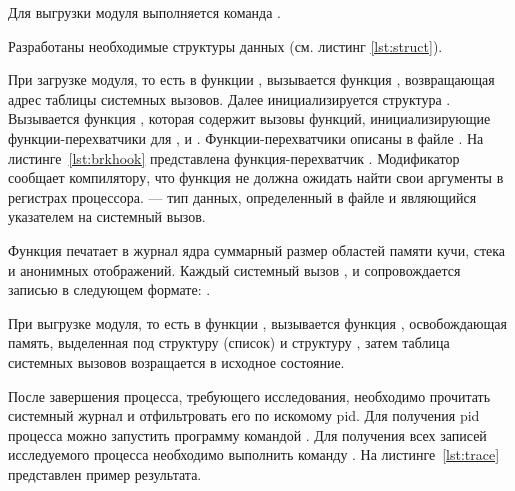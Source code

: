 Для выгрузки модуля выполняется команда .

Разработаны необходимые структуры данных (см. листинг \ref{lst:struct}).



При загрузке модуля, то есть в функции , вызывается функция , возвращающая адрес таблицы системных вызовов. Далее инициализируется структура . Вызывается функция , которая содержит вызовы функций, инициализирующие функции-перехватчики для ,  и . Функции-перехватчики описаны в файле . На листинге~\ref{lst:brkhook} представлена функция-перехватчик . Модификатор  сообщает компилятору, что функция не должна ожидать найти свои аргументы в регистрах процессора.  --- тип данных, определенный в файле  и являющийся указателем на системный вызов.



Функция  печатает в журнал ядра суммарный размер областей памяти кучи, стека и анонимных отображений. Каждый системный вызов ,  и  сопровождается записью в следующем формате: .

При выгрузке модуля, то есть в функции , вызывается функция , освобождающая память, выделенная под структуру (список)  и структуру , затем таблица системных вызовов возращается в исходное состояние.

После завершения процесса, требующего исследования, необходимо прочитать системный журнал и отфильтровать его по искомому pid. Для получения pid процесса можно запустить программу командой . Для получения всех записей  исследуемого процесса необходимо выполнить команду . На листинге~\ref{lst:trace} представлен пример результата.



